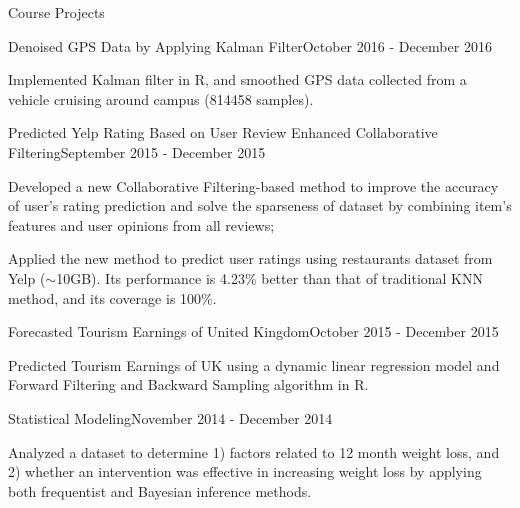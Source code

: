 \documentclass{my_resume} %
\begin{document}

\begin{rSection}{Course Projects}

\begin{rSubsection}{Denoised GPS Data by Applying Kalman Filter}{}{October
    2016 - December 2016}
  \item Implemented Kalman filter in R, and smoothed GPS data collected from a
  vehicle cruising around campus (814458 samples).
\end{rSubsection}

\begin{rSubsection}{Predicted Yelp Rating Based on User Review Enhanced
  Collaborative Filtering}{}{September 2015 - December 2015}
  \item Developed a new Collaborative Filtering-based method to improve the
    accuracy of user's rating prediction and solve the sparseness of dataset by
    combining item's features and user opinions from all reviews;
  \item Applied the new method to predict user ratings using restaurants dataset
    from Yelp ($\sim$10GB). Its performance is 4.23\% better than that of traditional KNN
    method, and its coverage is 100\%.
\end{rSubsection}

\begin{rSubsection}{Forecasted Tourism Earnings of United Kingdom}{}{October
  2015 - December 2015}
  \item Predicted Tourism Earnings of UK using a dynamic linear
    regression model and Forward Filtering and Backward Sampling algorithm in
    R.
\end{rSubsection}

\begin{rSubsection}{Statistical Modeling}{}{November 2014 - December 2014}
  \item Analyzed a dataset to determine 1) factors related to 12 month weight
  loss, and 2) whether an intervention was effective in increasing weight loss by
  applying both frequentist and Bayesian inference methods.
\end{rSubsection}
\end{rSection}

\end{document}

